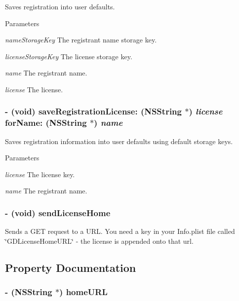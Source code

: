 Saves registration into user defaults. 
\begin{DoxyParams}{Parameters}
\item[{\em nameStorageKey}]The registrant name storage key. \item[{\em licenseStorageKey}]The license storage key. \item[{\em name}]The registrant name. \item[{\em license}]The license. \end{DoxyParams}
\hypertarget{interface_g_d_registration_a4ce808c5e052ea5080329c56b89df626}{
\subsubsection[{saveRegistrationLicense:forName:}]{\setlength{\rightskip}{0pt plus 5cm}-\/ (void) saveRegistrationLicense: (NSString $\ast$) {\em license}\/ forName: (NSString $\ast$) {\em name}}}
\label{interface_g_d_registration_a4ce808c5e052ea5080329c56b89df626}


Saves registration information into user defaults using default storage keys. 
\begin{DoxyParams}{Parameters}
\item[{\em license}]The license key. \item[{\em name}]The registrant name. \end{DoxyParams}
\hypertarget{interface_g_d_registration_a2aab3c30ff8931c4ce11159ecb3b830c}{
\subsubsection[{sendLicenseHome}]{\setlength{\rightskip}{0pt plus 5cm}-\/ (void) sendLicenseHome }}
\label{interface_g_d_registration_a2aab3c30ff8931c4ce11159ecb3b830c}


Sends a GET request to a URL. You need a key in your Info.plist file called \char`\"{}GDLicenseHomeURL\char`\"{} -\/ the license is appended onto that url. 

\subsection{Property Documentation}
\hypertarget{interface_g_d_registration_a8b801d18afbdb3062e0a79f39d0aee66}{
\subsubsection[{homeURL}]{\setlength{\rightskip}{0pt plus 5cm}-\/ (NSString $\ast$) homeURL}}
\label{interface_g_d_registration_a8b801d18afbdb3062e0a79f39d0aee66}


